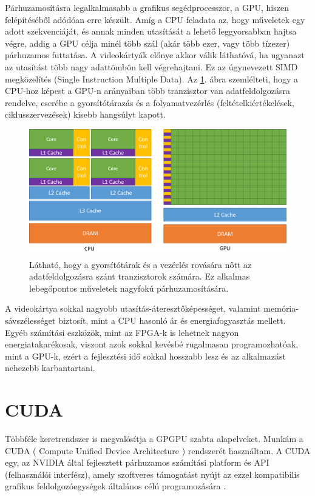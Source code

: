 Párhuzamosításra legalkalmasabb a grafikus segédprocesszor, a GPU, hiszen felépítéséből adódóan erre készült. Amíg a CPU feladata az, hogy műveletek egy adott szekvenciáját, és annak minden utasítását a lehető leggyorsabban hajtsa végre, addig a GPU célja minél több szál (akár több ezer, vagy több tízezer) párhuzamos futtatása. A videokártyák előnye akkor válik láthatóvá, ha ugyanazt az utasítást több nagy adattömbön kell végrehajtani. Ez az úgynevezett SIMD megközelítés (Single Instruction Multiple Data). \cite{kvantum_optim}
Az \ref{TransistorsInGpu}. ábra szemlélteti, hogy a CPU-hoz képest a GPU-n arányaiban több tranzisztor van adatfeldolgozásra rendelve, cserébe a gyorsítótárazás és a folyamatvezérlés (feltételkiértékelések, ciklusszervezések) kisebb hangsúlyt kapott.

\begin{figure}[ht!]
	\centering
	\includegraphics[width=150mm, keepaspectratio] {figures/gpu-devotes-more-transistors-to-data-processing.png}
	\caption{Látható, hogy a gyorsítótárak és a vezérlés rovására nőtt az adatfeldolgozásra szánt tranzisztorok számára. Ez alkalmas lebegőpontos műveletek nagyfokú párhuzamosítására. \cite{CUDAdoc} \label{TransistorsInGpu} }
\end{figure}


A videokártya sokkal nagyobb utasítás-áteresztőképességet, valamint memória-sávszélességet biztosít, mint a CPU hasonló ár és energiafogyasztás mellett. Egyéb számítási eszközök, mint az FPGA-k is lehetnek nagyon energiatakarékosak, viszont azok sokkal kevésbé rugalmasan programozhatóak, mint a GPU-k, ezért a fejlesztési idő sokkal hosszabb lesz és az alkalmazást nehezebb karbantartani. \cite{CUDAdoc}



\section{CUDA}
Többféle keretrendszer is megvalósítja a GPGPU szabta alapelveket. Munkám a CUDA ( Compute Unified Device Architecture ) rendszerét használtam. A CUDA egy, az NVIDIA által fejlesztett párhuzamos számítási platform és API (felhasználói interfész), amely szoftveres támogatást nyújt az ezzel kompatibilis grafikus feldolgozóegységek általános célú programozására \cite{kvantum_optim}. 

